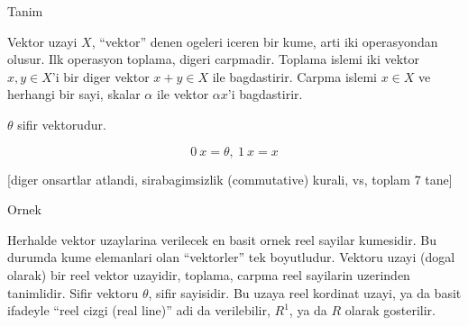 \documentclass[12pt,fleqn]{article}
\begin{document}
Tanim 

Vektor uzayi $X$, ``vektor'' denen ogeleri iceren bir kume, arti iki
operasyondan olusur. Ilk operasyon toplama, digeri carpmadir. Toplama
islemi iki vektor $x,y \in X$'i bir diger vektor $x+y \in X$ ile
bagdastirir. Carpma islemi $x \in X$ ve herhangi bir sayi, skalar $\alpha$
ile vektor $\alpha x$'i bagdastirir. 

$\theta$ sifir vektorudur. 

\[ 0 \ x = \theta, \ 1 \ x = x \]

[diger onsartlar atlandi, sirabagimsizlik (commutative) kurali, vs, toplam 7
tane]

Ornek

Herhalde vektor uzaylarina verilecek en basit ornek reel sayilar
kumesidir. Bu durumda kume elemanlari olan ``vektorler'' tek
boyutludur. Vektoru uzayi (dogal olarak) bir reel vektor uzayidir, toplama,
carpma reel sayilarin uzerinden tanimlidir. Sifir vektoru $\theta$, sifir
sayisidir. Bu uzaya reel kordinat uzayi, ya da basit ifadeyle ``reel cizgi
(real line)'' adi da verilebilir, $R^1$, ya da $R$ olarak gosterilir. 
\end{document}
